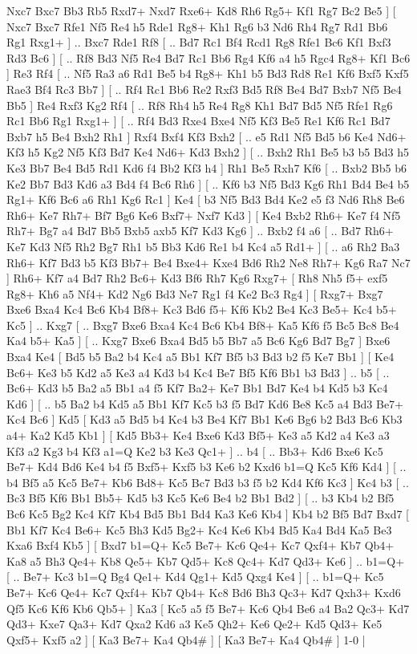  Nxc7 Bxc7  Bb3 Rb5  Rxd7+ Nxd7  Rxe6+ Kd8  Rh6 Rg5+  Kf1 Rg7  Bc2 Be5   ]  [  Nxc7 Bxc7  Rfe1 Nf5  Re4 h5  Rde1 Rg8+  Kh1 Rg6  b3 Nd6  Rh4 Rg7  Rd1 Bb6  Rg1 Rxg1+   ] .. Bxc7    Rde1   Rf8 [ .. Bd7  Rc1 Bf4  Rcd1 Rg8  Rfe1 Bc6  Kf1 Bxf3  Rd3 Bc6   ]  [ .. Rf8  Bd3 Nf5  Re4 Bd7  Rc1 Bb6  Rg4 Kf6  a4 h5  Rgc4 Rg8+  Kf1 Bc6   ]  Re3   Rf4 [ .. Nf5  Ra3 a6  Rd1 Be5  b4 Rg8+  Kh1 b5  Bd3 Rd8  Re1 Kf6  Bxf5 Kxf5  Rae3 Bf4  Rc3 Bb7   ]  [ .. Rf4  Rc1 Bb6  Re2 Rxf3  Bd5 Rf8  Be4 Bd7  Bxb7 Nf5  Be4 Bb5   ]  Re4   Rxf3    Kg2   Rf4 [ .. Rf8  Rh4 h5  Re4 Rg8  Kh1 Bd7  Bd5 Nf5  Rfe1 Rg6  Rc1 Bb6  Rg1 Rxg1+   ]  [ .. Rf4  Bd3 Rxe4  Bxe4 Nf5  Kf3 Be5  Re1 Kf6  Rc1 Bd7  Bxb7 h5  Be4 Bxh2  Rh1   ]  Rxf4   Bxf4    Kf3   Bxh2 [ .. e5  Rd1 Nf5  Bd5 b6  Ke4 Nd6+  Kf3 h5  Kg2 Nf5  Kf3 Bd7  Ke4 Nd6+  Kd3 Bxh2   ]  [ .. Bxh2  Rh1 Be5  b3 b5  Bd3 h5  Ke3 Bb7  Be4 Bd5  Rd1 Kd6  f4 Bb2  Kf3 h4   ]  Rh1   Be5    Rxh7   Kf6 [ .. Bxb2  Bb5 b6  Ke2 Bb7  Bd3 Kd6  a3 Bd4  f4 Bc6  Rh6   ]  [ .. Kf6  b3 Nf5  Bd3 Kg6  Rh1 Bd4  Be4 b5  Rg1+ Kf6  Bc6 a6  Rh1 Kg6  Rc1   ]  Ke4 [  b3 Nf5  Bd3 Bd4  Ke2 e5  f3 Nd6  Rh8 Be6  Rh6+ Ke7  Rh7+ Bf7  Bg6 Ke6  Bxf7+ Nxf7  Kd3   ]  [  Ke4 Bxb2  Rh6+ Ke7  f4 Nf5  Rh7+ Bg7  a4 Bd7  Bb5 Bxb5  axb5 Kf7  Kd3 Kg6   ] .. Bxb2    f4   a6 [ .. Bd7  Rh6+ Ke7  Kd3 Nf5  Rh2 Bg7  Rh1 b5  Bb3 Kd6  Re1 b4  Kc4 a5  Rd1+   ]  [ .. a6  Rh2 Ba3  Rh6+ Kf7  Bd3 b5  Kf3 Bb7+  Be4 Bxe4+  Kxe4 Bd6  Rh2 Ne8  Rh7+ Kg6  Ra7 Nc7   ]  Rh6+   Kf7    a4   Bd7    Rh2   Bc6+    Kd3   Bf6    Rh7   Kg6    Rxg7+ [  Rh8 Nh5  f5+ exf5  Rg8+ Kh6  a5 Nf4+  Kd2 Ng6  Bd3 Ne7  Rg1 f4  Ke2 Bc3  Rg4   ]  [  Rxg7+ Bxg7  Bxe6 Bxa4  Kc4 Bc6  Kb4 Bf8+  Kc3 Bd6  f5+ Kf6  Kb2 Be4  Kc3 Be5+  Kc4 b5+  Kc5   ] .. Kxg7 [ .. Bxg7  Bxe6 Bxa4  Kc4 Bc6  Kb4 Bf8+  Ka5 Kf6  f5 Bc5  Bc8 Be4  Ka4 b5+  Ka5   ]  [ .. Kxg7  Bxe6 Bxa4  Bd5 b5  Bb7 a5  Bc6 Kg6  Bd7 Bg7   ]  Bxe6   Bxa4    Ke4 [  Bd5 b5  Ba2 b4  Kc4 a5  Bb1 Kf7  Bf5 b3  Bd3 b2  f5 Ke7  Bb1   ]  [  Ke4 Bc6+  Ke3 b5  Kd2 a5  Ke3 a4  Kd3 b4  Kc4 Be7  Bf5 Kf6  Bb1 b3  Bd3   ] .. b5 [ .. Bc6+  Kd3 b5  Ba2 a5  Bb1 a4  f5 Kf7  Ba2+ Ke7  Bb1 Bd7  Ke4 b4  Kd5 b3  Kc4 Kd6   ]  [ .. b5  Ba2 b4  Kd5 a5  Bb1 Kf7  Kc5 b3  f5 Bd7  Kd6 Be8  Kc5 a4  Bd3 Be7+  Kc4 Bc6   ]  Kd5 [  Kd3 a5  Bd5 b4  Kc4 b3  Be4 Kf7  Bb1 Ke6  Bg6 b2  Bd3 Bc6  Kb3 a4+  Ka2 Kd5  Kb1   ]  [  Kd5 Bb3+  Ke4 Bxe6  Kd3 Bf5+  Ke3 a5  Kd2 a4  Ke3 a3  Kf3 a2  Kg3 b4  Kf3 a1=Q  Ke2 b3  Ke3 Qc1+   ] .. b4 [ .. Bb3+  Kd6 Bxe6  Kc5 Be7+  Kd4 Bd6  Ke4 b4  f5 Bxf5+  Kxf5 b3  Ke6 b2  Kxd6 b1=Q  Kc5 Kf6  Kd4   ]  [ .. b4  Bf5 a5  Kc5 Be7+  Kb6 Bd8+  Kc5 Bc7  Bd3 b3  f5 b2  Kd4 Kf6  Kc3   ]  Kc4   b3 [ .. Bc3  Bf5 Kf6  Bb1 Bb5+  Kd5 b3  Kc5 Ke6  Be4 b2  Bb1 Bd2   ]  [ .. b3  Kb4 b2  Bf5 Bc6  Kc5 Bg2  Kc4 Kf7  Kb4 Bd5  Bb1 Bd4  Ka3 Ke6  Kb4   ]  Kb4   b2    Bf5   Bd7    Bxd7 [  Bb1 Kf7  Kc4 Be6+  Kc5 Bh3  Kd5 Bg2+  Kc4 Ke6  Kb4 Bd5  Ka4 Bd4  Ka5 Be3  Kxa6 Bxf4  Kb5   ]  [  Bxd7 b1=Q+  Kc5 Be7+  Kc6 Qe4+  Kc7 Qxf4+  Kb7 Qb4+  Ka8 a5  Bh3 Qe4+  Kb8 Qe5+  Kb7 Qd5+  Kc8 Qc4+  Kd7 Qd3+  Ke6   ] .. b1=Q+ [ .. Be7+  Kc3 b1=Q  Bg4 Qe1+  Kd4 Qg1+  Kd5 Qxg4  Ke4   ]  [ .. b1=Q+  Kc5 Be7+  Kc6 Qe4+  Kc7 Qxf4+  Kb7 Qb4+  Kc8 Bd6  Bh3 Qc3+  Kd7 Qxh3+  Kxd6 Qf5  Kc6 Kf6  Kb6 Qb5+   ]  Ka3 [  Kc5 a5  f5 Be7+  Kc6 Qb4  Be6 a4  Ba2 Qc3+  Kd7 Qd3+  Kxe7 Qa3+  Kd7 Qxa2  Kd6 a3  Ke5 Qh2+  Ke6 Qe2+  Kd5 Qd3+  Ke5 Qxf5+  Kxf5 a2   ]  [  Ka3 Be7+  Ka4 Qb4#   ]  [  Ka3 Be7+  Ka4 Qb4#   ] 1-0  |
